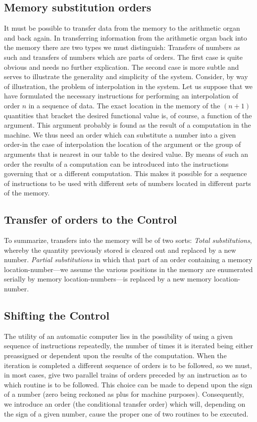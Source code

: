 \documentclass[12pt]{amsart}
\begin{document}
\subsection{Memory substitution orders}
It must be possible to transfer data from the memory to the arithmetic organ and back again. In transferring information from the arithmetic organ back into the memory there are two types we must distinguish: Transfers of numbers as such and transfers of numbers which are parts of orders. The first case is quite obvious and needs no further explication. The second case is more subtle and serves to illustrate the generality and simplicity of the system. Consider, by way of illustration, the problem of interpolation in the system. Let us suppose that we have formulated the necessary instructions for performing an interpolation of order $n$ in a sequence of data. The exact location in the memory of the $(n + 1)$ quantities that bracket the desired functional value is, of course, a function of the argument. This argument probably is found as the result of a computation in the machine. We thus need an order which can substitute a number into a given order-in the case of interpolation the location of the argument or the group of arguments that is nearest in our table to the desired value. By means of such an order the results of a computation can be introduced into the instructions governing that or a different computation. This makes it possible for a sequence of instructions to be used with different sets of numbers located in different parts of the memory.

\subsection{Transfer of orders to the Control}
To summarize, transfers into the memory will be of two sorts: \emph{Total substitutions}, whereby the quantity previously stored is cleared out and replaced by a new number. \emph{Partial substitutions} in which that part of an order containing a memory location-number---we assume the various positions in the memory are enumerated serially by memory location-numbers---is replaced by a new memory location-number.

\subsection{Shifting the Control}
The utility of an automatic computer lies in the possibility of using a given sequence of instructions repeatedly, the number of times it is iterated being either preassigned or dependent upon the results of the computation. When the iteration is completed a different sequence of orders is to be followed, so we must, in most cases, give two parallel trains of orders preceded by an instruction as to which routine is to be followed. This choice can be made to depend upon the sign of a number (zero being reckoned as plus for machine purposes). Consequently, we introduce an order (the conditional transfer order) which will, depending on the sign of a given number, cause the proper one of two routines to be executed.
\end{document}
